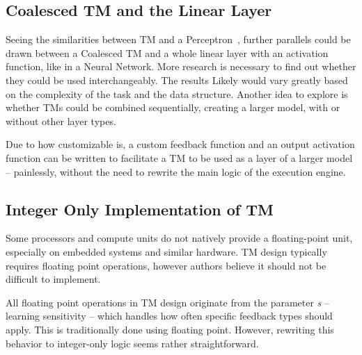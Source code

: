 \subsection{Coalesced TM and the Linear Layer}
Seeing the similarities between TM and a Perceptron~\cite{sharma2022equivalenceweightedtsetlinmachine}, further parallels could be drawn between a Coalesced TM and a whole linear layer with an activation function, like in a Neural Network. More research is necessary to find out whether they could be used interchangeably. The results Likely would vary greatly based on the complexity of the task and the data structure. Another idea to explore is whether TMs could be combined sequentially, creating a larger model, with or without other layer types.

Due to how customizable \LibraryName is, a custom feedback function and an output activation function can be written to facilitate a TM to be used as a layer of a larger model -- painlessly, without the need to rewrite the main logic of the execution engine.

\subsection{Integer Only Implementation of TM}
Some processors and compute units do not natively provide a floating-point unit, especially on embedded systems and similar hardware. TM design typically requires floating point operations, however authors believe it should not be difficult to implement.

All floating point operations in TM design originate from the parameter \textit{s} -- learning sensitivity -- which handles how often specific feedback types should apply. This is traditionally done using floating point. However, rewriting this behavior to integer-only logic seems rather straightforward.